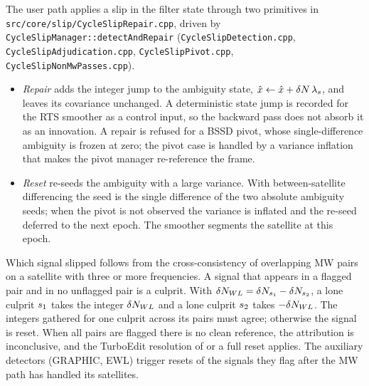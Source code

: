 \documentclass[main.tex]{subfiles}
\begin{document}
The user path applies a slip in the filter state through two primitives in
\texttt{src/core/slip/CycleSlipRepair.cpp}, driven by
\texttt{CycleSlipManager::detectAndRepair}
(\texttt{CycleSlipDetection.cpp}, \texttt{CycleSlipAdjudication.cpp},
\texttt{CycleSlipPivot.cpp}, \texttt{CycleSlipNonMwPasses.cpp}).
\begin{itemize}[leftmargin=*, itemsep=0pt]
\item \emph{Repair} adds the integer jump to the ambiguity state,
  $\hat x \leftarrow \hat x + \delta N\,\lambda_s$, and leaves its
  covariance unchanged.  A deterministic state jump is recorded for the RTS
  smoother as a control input, so the backward pass does not absorb it as an
  innovation.  A repair is refused for a BSSD pivot, whose single-difference
  ambiguity is frozen at zero; the pivot case is handled by a variance
  inflation that makes the pivot manager re-reference the frame.
\item \emph{Reset} re-seeds the ambiguity with a large variance.  With
  between-satellite differencing the seed is the single difference of the two
  absolute ambiguity seeds; when the pivot is not observed the variance is
  inflated and the re-seed deferred to the next epoch.  The smoother
  segments the satellite at this epoch.
\end{itemize}
Which signal slipped follows from the cross-consistency of overlapping MW
pairs on a satellite with three or more frequencies.  A signal that appears in
a flagged pair and in no unflagged pair is a culprit.  With
$\delta N_{WL} = \delta N_{s_1} - \delta N_{s_2}$, a lone culprit
$s_1$ takes the integer $\delta N_{WL}$ and a lone culprit $s_2$ takes
$-\delta N_{WL}$.  The integers gathered for one culprit across its pairs must
agree; otherwise the signal is reset.  When all pairs are flagged there is no
clean reference, the attribution is inconclusive, and the TurboEdit
resolution of  or a full reset applies.  The
auxiliary detectors (GRAPHIC, EWL) trigger resets of the signals they flag
after the MW path has handled its satellites.

\ifSubfilesClassLoaded{\printbibliography}{}
\end{document}
